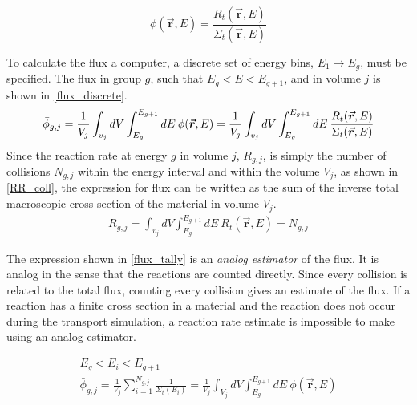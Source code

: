 \begin{equation}
\label{flux_from_RR}
\phi(\boldsymbol{\vec{r}},E) = \frac{ R_t(\boldsymbol{\vec{r}},E) }{  \Sigma_t(\boldsymbol{\vec{r}},E) }
\end{equation}

To calculate the flux a computer, a discrete set of energy bins, $E_1 \rightarrow E_g$, must be specified.  The flux in group $g$, such that $E_g < E < E_{g+1}$, and in volume $j$ is shown in \eqref{flux_discrete}.
%
\begin{equation}
\label{flux_discrete}
\bar{\phi}_{g,j} = \frac{1}{V_j} \int_{v_j} dV \int_{E_g}^{E_{g+1}} dE \: \phi(\boldsymbol{\vec{r}},E) = \frac{1}{V_j} \int_{v_j} dV \int_{E_g}^{E_{g+1}} dE \:\frac{ R_t(\boldsymbol{\vec{r}},E) }{  \Sigma_t(\boldsymbol{\vec{r}},E) } \\
\end{equation}
%
Since the reaction rate at energy $g$ in volume $j$, $R_{g,j}$, is simply the number of collisions $N_{g,j}$ within the energy interval and within the volume $V_j$, as shown in \eqref{RR_coll}, the expression for flux can be written as the sum of the inverse total macroscopic cross section of the material in volume $V_j$. %
%
\begin{equation}
\label{RR_coll}
\begin{gathered}
R_{g,j} = \int_{v_j} dV \int_{E_g}^{E_{g+1}} dE \: R_t(\boldsymbol{\vec{r}},E) = N_{g,j}
\end{gathered}
\end{equation}

The expression shown in \eqref{flux_tally} is an \emph{analog estimator} of the flux.  It is analog in the sense that the reactions are counted directly.  Since every collision is related to the total flux, counting every collision gives an estimate of the flux.  If a reaction has a finite cross section in a material and the reaction does not occur during the transport simulation, a reaction rate estimate is impossible to make using an analog estimator. 

\begin{equation}
\label{flux_tally}
\begin{gathered}
E_g < E_i < E_{g+1} \\
\bar{\phi}_{g,j} =  \frac{1}{V_j} \sum_{i=1}^{N_{g,j}} \frac{1}{\Sigma_t(E_i)} =  \frac{1}{V_j} \int_{V_j} dV \int_{E_g}^{E_{g+1}} dE \: \phi(\boldsymbol{\vec{r}},E) 
\end{gathered}
\end{equation}

